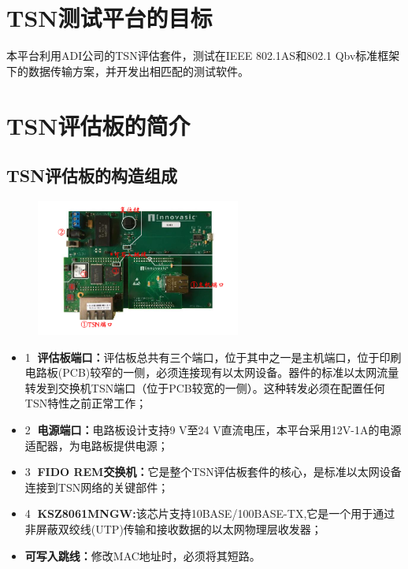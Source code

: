 \chapter{TSN测试平台的目标}
本平台利用ADI公司的TSN评估套件，测试在IEEE 802.1AS和802.1 Qbv标准框架下的数据传输方案，并开发出相匹配的测试软件。

\chapter{TSN评估板的简介}

\section{TSN评估板的构造组成}

\begin{figure}[h]
    \centering
    \label{structure1}
    \includegraphics[width=0.6\textwidth]{pic/composition.png}
    \caption{}
\end{figure}

\begin{itemize}
    \item \textcircled{1} \textbf{评估板端口：}评估板总共有三个端口，位于其中之一是主机端口，位于印刷电路板(PCB)较窄的一侧，必须连接现有以太网设备。器件的标准以太网流量转发到交换机TSN端口（位于PCB较宽的一侧）。这种转发必须在配置任何TSN特性之前正常工作；
    \item \textcircled{2} \textbf{电源端口：}电路板设计支持9 V至24 V直流电压，本平台采用12V-1A的电源适配器，为电路板提供电源；
    \item \textcircled{3} \textbf{FIDO REM交换机：}它是整个TSN评估板套件的核心，是标准以太网设备连接到TSN网络的关键部件；
    \item \textcircled{4} \textbf{KSZ8061MNGW:}该芯片支持10BASE/100BASE-TX,它是一个用于通过非屏蔽双绞线(UTP)传输和接收数据的以太网物理层收发器；
    \item \textbf{可写入跳线：}修改MAC地址时，必须将其短路。
\end{itemize}

